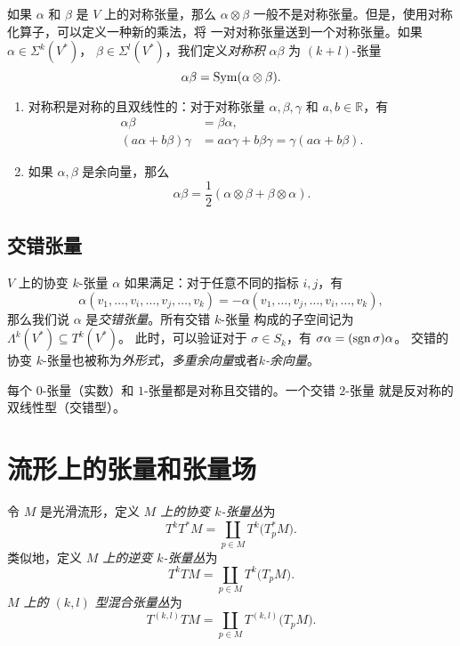 如果 $\alpha$ 和 $\beta$ 是 $V$ 上的对称张量，那么 $\alpha\otimes\beta$
一般不是对称张量。但是，使用对称化算子，可以定义一种新的乘法，将
一对对称张量送到一个对称张量。如果 $\alpha\in \Sigma^k(V^*)$，
$\beta\in \Sigma^l(V^*)$，我们定义\emph{对称积} $\alpha\beta$
为 $(k+l)$-张量
\[
  \alpha\beta=\operatorname{Sym}(\alpha\otimes\beta).  
\]

\begin{proposition}[对称积的性质]
  \mbox{}
  \begin{enumerate}
    \item 对称积是对称的且双线性的：对于对称张量 $\alpha,\beta,\gamma$
    和 $a,b\in \mathbb{R}$，有
    \begin{align*}
      \alpha\beta&=\beta\alpha,\\
      (a\alpha+b\beta)\gamma&=a\alpha\gamma+b\beta\gamma=
      \gamma(a\alpha+b\beta).
    \end{align*}
    \item 如果 $\alpha,\beta$ 是余向量，那么
    \[
      \alpha\beta=\frac{1}{2}(\alpha\otimes\beta+\beta\otimes\alpha).  
    \]
  \end{enumerate}
\end{proposition}

\subsection{交错张量}

$V$ 上的协变 $k$-张量 $\alpha$ 如果满足：对于任意不同的指标 $i,j$，有
\[
  \alpha(v_1,\dots,v_i,\dots,v_j,\dots,v_k)=
  -\alpha(v_1,\dots,v_j,\dots,v_i,\dots,v_k),
\]
那么我们说 $\alpha$ 是\emph{交错张量}。所有交错 $k$-张量
构成的子空间记为 $\Lambda^k(V^*)\subseteq T^k(V^*)$。
此时，可以验证对于 $\sigma\in S_k$，有 $\sigma\alpha=(\operatorname{sgn}\sigma)\alpha$。
交错的协变 $k$-张量也被称为\emph{外形式}，\emph{多重余向量}或者\emph{$k$-余向量}。

每个 $0$-张量（实数）和 $1$-张量都是对称且交错的。一个交错 $2$-张量
就是反对称的双线性型（交错型）。


\section{流形上的张量和张量场}

令 $M$ 是光滑流形，定义 \emph{$M$ 上的协变 $k$-张量丛}为
\[
  T^kT^*M=\coprod_{p\in M}T^k\bigl(T_p^*M\bigr).  
\] 
类似地，定义 \emph{$M$ 上的逆变 $k$-张量丛}为
\[
  T^kTM=\coprod_{p\in M}T^k\bigl(T_pM\bigr)  .
\]
\emph{$M$ 上的 $(k,l)$ 型混合张量丛}为
\[
  T^{(k,l)}TM=\coprod_{p\in M}  T^{(k,l)}\bigl(T_pM\bigr).
\]

